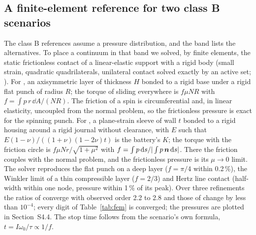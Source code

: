 \subsection{A finite-element reference for two class B scenarios}\label{sec:fem}

The class B references assume a pressure distribution, and the band lists the alternatives. To
place a continuum in that band we solved, by finite elements, the static frictionless contact of
a linear-elastic support with a rigid body (small strain, quadratic quadrilaterals, unilateral
contact solved exactly by an active set; ). For , an axisymmetric layer
of thickness $H$ bonded to a rigid base under a rigid flat punch of radius $R$; the torque of
sliding everywhere is $f\mu NR$ with $f=\int p\,r\,\dd A/(NR)$. The friction of a spin is
circumferential and, in linear elasticity, uncoupled from the normal problem, so the frictionless
pressure is exact for the spinning punch. For , a plane-strain sleeve of wall $t$
bonded to a rigid housing around a rigid journal without clearance, with $E$ such that
$E(1-\nu)/((1+\nu)(1-2\nu)t)$ is the battery's $K$; the torque with the friction circle is
$f\mu Nr/\sqrt{1+\mu^2}$ with $f=\int p\,\mathrm{d} s/|\int p\,\boldsymbol{n}\,\mathrm{d} s|$. There the friction couples
with the normal problem, and the frictionless pressure is its $\mu\to0$ limit. The solver
reproduces the flat punch on a deep layer ($f=\pi/4$ within 0.2\,\%), the Winkler limit of a thin
compressible layer ($f=2/3$) and Hertz line contact (half-width within one node, pressure within
1\,\% of its peak). Over three refinements the ratios of  converge with observed order
2.2 to 2.8 and those of  change by less than $10^{-4}$; every digit of
Table~\ref{tab:fem} is converged; the pressures are plotted in Section~S4.4. The stop time follows from the scenario's own formula,
$t=I\omega_0/\tau\propto1/f$.

